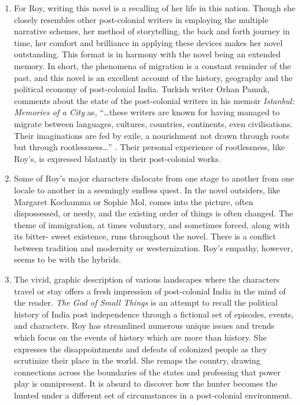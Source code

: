 \begin{enumerate}
  \item For Roy, writing this novel is a recalling of her life in this nation.  Though she closely resembles other post-colonial writers in employing the multiple narrative schemes, her method of storytelling, the back and forth journey in time, her comfort and brilliance in applying these devices makes her novel outstanding.  This format is in harmony with the novel being an extended memory.  In short, the phenomena of migration is a constant reminder of the past, and this novel is an excellent account of the history, geography and the political economy of post-colonial India. Turkish writer Orhan Pamuk, comments about the state of the post-colonial writers in his memoir \emph{Istanbul: Memories of a City} as, ``\ldots these writers are known for having managed to migrate between languages, cultures, countries, continents, even civilisations.  Their imaginations are fed by exile, a nourishment not drawn through roots but through rootlessness\ldots'' \parencite[6]{Pamuk2006}.  Their personal experience of rootlessness, like Roy's, is expressed blatantly in their post-colonial works.

  \item Some of Roy's major characters dislocate from one stage to another from one locale to another in a seemingly endless quest. In the novel outsiders, like Margaret Kochamma or Sophie Mol, comes into the picture, often dispossessed, or needy, and the existing order of things is often changed.  The theme of immigration, at times voluntary, and sometimes forced, along with its bitter- sweet existence, runs throughout the novel. There is a conflict between tradition and modernity or westernization. Roy's empathy, however, seems to be with the hybrids.

  \item The vivid, graphic description of various landscapes where the characters travel or stay offers a fresh impression of post-colonial India in the mind of the reader.  \emph{The God of Small Things} is an attempt to recall the political history of India post independence through a fictional set of episodes, events, and characters. Roy has streamlined numerous unique issues and trends which focus on the events of history which are more than history.  She expresses the disappointments and defeats of colonized people as they scrutinize their place in the world.  She remaps the country, drawing connections across the boundaries of the states and professing that power play is omnipresent. It is absurd to discover how the hunter becomes the hunted under a different set of circumstances in a post-colonial environment. 


\end{enumerate}

